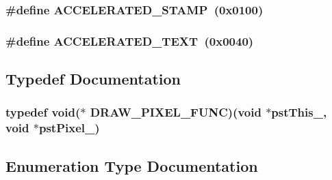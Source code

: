 \subsubsection[{ACCELERATED\_\-STAMP}]{\setlength{\rightskip}{0pt plus 5cm}\#define ACCELERATED\_\-STAMP~(0x0100)}\label{display_8h_abfce1d83150b7eaa183d991a8a814e4d}
\subsubsection[{ACCELERATED\_\-TEXT}]{\setlength{\rightskip}{0pt plus 5cm}\#define ACCELERATED\_\-TEXT~(0x0040)}\label{display_8h_a30f07f1ca629b1f7053fa15656e78374}


\subsection{Typedef Documentation}
\subsubsection[{DRAW\_\-PIXEL\_\-FUNC}]{\setlength{\rightskip}{0pt plus 5cm}typedef void($\ast$ {\bf DRAW\_\-PIXEL\_\-FUNC})(void $\ast$pstThis\_\-, void $\ast$pstPixel\_\-)}\label{display_8h_a661a375d0fb3656526fe1a03b2e1cd5b}


\subsection{Enumeration Type Documentation}
